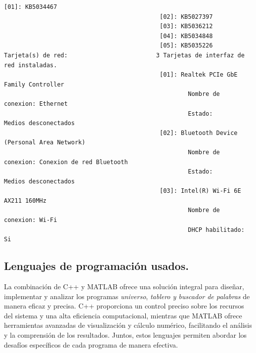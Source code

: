 \documentclass{article}
\begin{document}
\begin{lstlisting}[language={},basicstyle=\ttfamily\footnotesize]
                                            [01]: KB5034467
                                            [02]: KB5027397
                                            [03]: KB5036212
                                            [04]: KB5034848
                                            [05]: KB5035226
Tarjeta(s) de red:                         3 Tarjetas de interfaz de red instaladas.
                                            [01]: Realtek PCIe GbE Family Controller
                                                    Nombre de conexion: Ethernet
                                                    Estado:             Medios desconectados
                                            [02]: Bluetooth Device (Personal Area Network)
                                                    Nombre de conexion: Conexion de red Bluetooth
                                                    Estado:             Medios desconectados
                                            [03]: Intel(R) Wi-Fi 6E AX211 160MHz
                                                    Nombre de conexion: Wi-Fi
                                                    DHCP habilitado:    Si

            \end{lstlisting}
    \subsection[Lenguajes]{Lenguajes de programación usados.}
    La combinación de C++ y MATLAB ofrece una solución integral para diseñar, implementar y analizar los programas \textit{universo},
    \textit{tablero y buscador de palabras} de manera eficaz y precisa. C++ proporciona un control preciso sobre los recursos del
    sistema y una alta eficiencia computacional, mientras que MATLAB ofrece herramientas avanzadas de visualización y cálculo numérico,
    facilitando el análisis y la comprensión de los resultados. Juntos, estos lenguajes permiten abordar los desafíos específicos de
    cada programa de manera efectiva.
\end{document}
